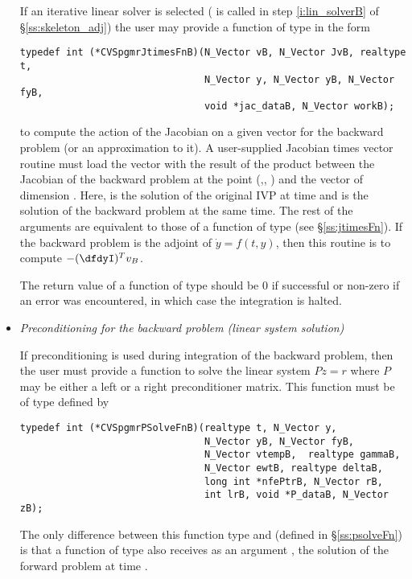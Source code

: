 \begin{itemize}
  If an iterative {\spgmr} linear solver is selected ( is called in step 
  \ref{i:lin_solverB} of \S\ref{ss:skeleton_adj}) the user may provide a function
  of type  in the form 
\begin{verbatim}
typedef int (*CVSpgmrJtimesFnB)(N_Vector vB, N_Vector JvB, realtype t, 
                                N_Vector y, N_Vector yB, N_Vector fyB,
                                void *jac_dataB, N_Vector workB);
\end{verbatim}
  to compute the action of the Jacobian on a given vector  for
  the backward problem (or an approximation to it).
  A user-supplied Jacobian times vector routine must load the vector 
  with the result of the product between the Jacobian of the backward problem 
  at the point (,, ) and the vector  of dimension 
  . Here,  is the solution of the original IVP at time  and 
   is the solution of the backward problem at the same time.  
  The rest of the arguments are equivalent to those of a function of type
   (see \S\ref{ss:jtimesFn}).
  If the backward problem is the adjoint of ${\dot y} = f(t, y)$, then this 
  routine is to compute $-(\dfdyI)^T v_B$.

  The return value of a function of type  should be
  $0$ if successful or non-zero if an error was encountered, in which case
  the integration is halted.

\item {\em Preconditioning for the backward problem
    (linear system solution)}

  If preconditioning is used during integration of the backward problem, 
  then the user must provide a {\C} function to solve the linear system 
  $Pz = r$ where $P$ may be either a left or a right preconditioner matrix.
  This function must be of type  defined by
\begin{verbatim}
typedef int (*CVSpgmrPSolveFnB)(realtype t, N_Vector y, 
                                N_Vector yB, N_Vector fyB, 
                                N_Vector vtempB,  realtype gammaB, 
                                N_Vector ewtB, realtype deltaB, 
                                long int *nfePtrB, N_Vector rB, 
                                int lrB, void *P_dataB, N_Vector zB);
\end{verbatim}
  The only difference between this function type and 
  (defined in \S\ref{ss:psolveFn}) is that
  a function of type  also receives as an argument
  , the solution of the forward problem at time .


\end{itemize}
